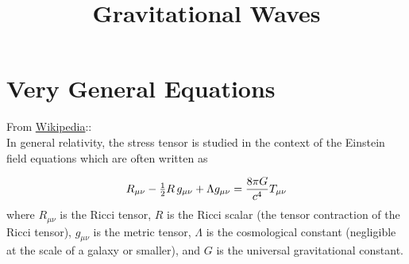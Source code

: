 \documentclass[11pt,a4paper]{article}
\begin{document}
\title{Gravitational Waves}
\maketitle



\section{Very General Equations}
From \href{https://en.wikipedia.org/wiki/Stress-Energy_tensor}{Wikipedia}:: \\

In general relativity, the stress tensor is studied in the context of the Einstein field equations which are often written as

\begin{equation}
  R_{\mu \nu }-{\tfrac {1}{2}}R\,g_{\mu \nu }+\Lambda g_{\mu \nu }={8\pi G \over c^{4}}T_{\mu \nu } 
\end{equation}
where $R_{\mu \nu}$ is the Ricci tensor, $R$ is the Ricci scalar (the
tensor contraction of the Ricci tensor), $g_{\mu \nu }$ is the metric
tensor, $\Lambda$ is the cosmological constant (negligible at the
scale of a galaxy or smaller), and $G$ is the universal gravitational
constant.
\end{document}
